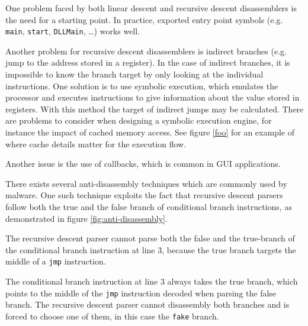 One problem faced by both linear descent and recursive descent disassemblers is the need for a starting point. In practice, exported entry point symbols (e.g. \texttt{main}, \texttt{start}, \texttt{DLLMain}, …) works well.


Another problem for recursive descent disassemblers is indirect branches (e.g. jump to the address stored in a register). In the case of indirect branches, it is impossible to know the branch target by only looking at the individual instructions. One solution is to use symbolic execution, which emulates the processor and executes instructions to give information about the value stored in registers. With this method the target of indirect jumps may be calculated. There are problems to consider when designing a symbolic execution engine, for instance the impact of cached memory access. See figure \ref{foo} for an example of where cache details matter for the execution flow.



Another issue is the use of callbacks, which is common in GUI applications.

There exists several anti-disassembly techniques which are commonly used by malware. One such technique exploits the fact that recursive descent parsers follow both the true and the false branch of conditional branch instructions, as demonstrated in figure \ref{fig:anti-disassembly}.

The recursive descent parser cannot parse both the false and the true-branch of the conditional branch instruction at line 3, because the true branch targets the middle of a \texttt{jmp} instruction.

The conditional branch instruction at line 3 always takes the true branch, which points to the middle of the \texttt{jmp} instruction decoded when parsing the false branch. The recursive descent parser cannot disassembly both branches and is forced to choose one of them, in this case the \texttt{fake} branch.

